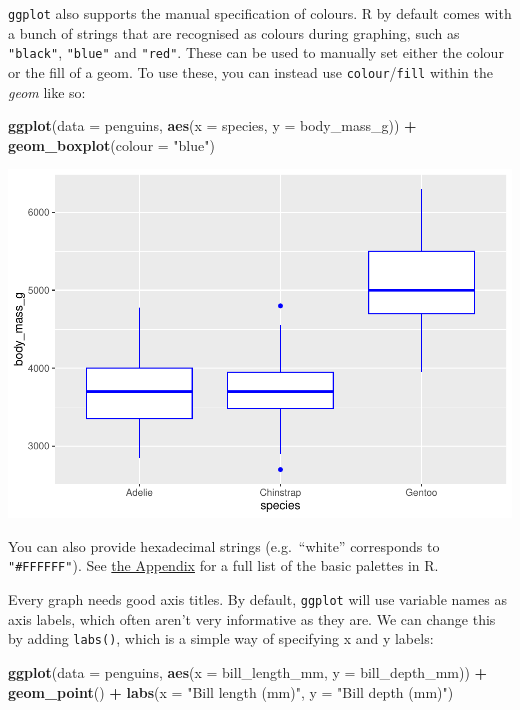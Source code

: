 \documentclass[
]{book}
\newenvironment{Shaded}{\begin{snugshade}}{\end{snugshade}}
\newcommand{\AttributeTok}[1]{\textcolor[rgb]{0.13,0.29,0.53}{#1}}
\newcommand{\FunctionTok}[1]{\textcolor[rgb]{0.13,0.29,0.53}{\textbf{#1}}}
\newcommand{\NormalTok}[1]{#1}
\newcommand{\SpecialCharTok}[1]{\textcolor[rgb]{0.81,0.36,0.00}{\textbf{#1}}}
\newcommand{\StringTok}[1]{\textcolor[rgb]{0.31,0.60,0.02}{#1}}
\begin{document}
\texttt{ggplot} also supports the manual specification of colours. R by default comes with a bunch of strings that are recognised as colours during graphing, such as \texttt{"black"}, \texttt{"blue"} and \texttt{"red"}. These can be used to manually set either the colour or the fill of a geom. To use these, you can instead use \texttt{colour}/\texttt{fill} within the \emph{geom} like so:

\begin{Shaded}
\begin{Highlighting}[]
\FunctionTok{ggplot}\NormalTok{(}\AttributeTok{data =}\NormalTok{ penguins, }\FunctionTok{aes}\NormalTok{(}\AttributeTok{x =}\NormalTok{ species, }\AttributeTok{y =}\NormalTok{ body\_mass\_g)) }\SpecialCharTok{+} 
  \FunctionTok{geom\_boxplot}\NormalTok{(}\AttributeTok{colour =} \StringTok{"blue"}\NormalTok{)}
\end{Highlighting}
\end{Shaded}

\includegraphics{_main_files/figure-latex/unnamed-chunk-60-1.pdf}

You can also provide hexadecimal strings (e.g.~``white'' corresponds to \texttt{"\#FFFFFF"}). See \protect\hyperlink{colours}{the Appendix} for a full list of the basic palettes in R.

Every graph needs good axis titles. By default, \texttt{ggplot} will use variable names as axis labels, which often aren't very informative as they are. We can change this by adding \texttt{labs()}, which is a simple way of specifying x and y labels:

\begin{Shaded}
\begin{Highlighting}[]
\FunctionTok{ggplot}\NormalTok{(}\AttributeTok{data =}\NormalTok{ penguins, }\FunctionTok{aes}\NormalTok{(}\AttributeTok{x =}\NormalTok{ bill\_length\_mm, }\AttributeTok{y =}\NormalTok{ bill\_depth\_mm)) }\SpecialCharTok{+} 
  \FunctionTok{geom\_point}\NormalTok{() }\SpecialCharTok{+}
  \FunctionTok{labs}\NormalTok{(}\AttributeTok{x =} \StringTok{"Bill length (mm)"}\NormalTok{, }\AttributeTok{y =} \StringTok{"Bill depth (mm)"}\NormalTok{) }
\end{Highlighting}
\end{Shaded}
\end{document}
